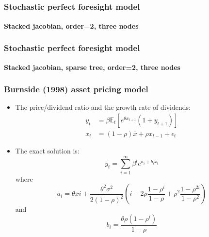 \documentclass{beamer}
\begin{document}
\begin{frame}
    \frametitle{Stochastic perfect foresight model}
    \framesubtitle{Stacked jacobian, order=2, three nodes}
  \begin{center}
    \scalebox{.5}{
  }
  \end{center}

\end{frame}


\begin{frame}
    \frametitle{Stochastic perfect foresight model}
    \framesubtitle{Stacked jacobian, sparse tree, order=2, three nodes}
  \begin{center}
    \scalebox{.6}{
  }
  \end{center}

\end{frame}


\begin{frame}
  \frametitle{Burnside (1998) asset pricing model}

\begin{itemize}

  \item The price/dividend ratio and the growth rate of dividends:
  \[
    \begin{split}
      y_t &= \beta \mathbb E_t\left[e^{\theta x_{t+1}}\left(1+y_{t+1}\right)\right]\\
      x_t &= (1-\rho)\bar x + \rho x_{t-1}+\epsilon_t
    \end{split}
  \]

  \item The exact solution is:
\[
    y_t = \sum_{i=1}^\infty \beta^i e^{a_i+b_i\hat x_t}
\]
where
\[
    a_i = \theta \bar x i +
\frac{\theta^2\sigma^2}{2(1-\rho)^2}\left(i-2\rho\frac{1-\rho^i}{1-\rho}+\rho^2\frac{1-\rho^{2i}}{1-\rho^2}\right)
\]
and
\[
b_i = \frac{\theta\rho\left(1-\rho^i\right)}{1-\rho}
\]

\end{itemize}

\end{frame}
\end{document}
